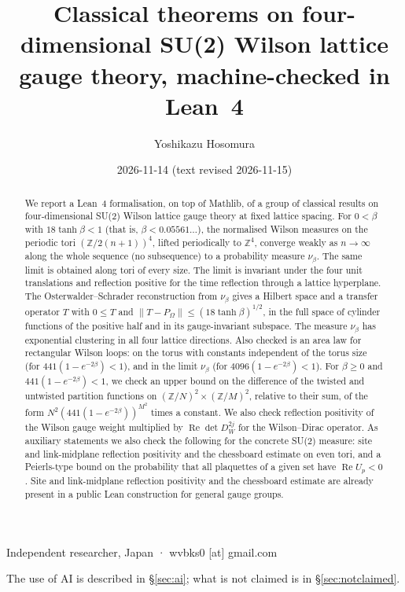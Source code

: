 \documentclass[11pt,a4paper]{article}
\title{Classical theorems on four-dimensional SU(2) Wilson lattice gauge theory, machine-checked in Lean~4}
\author{Yoshikazu Hosomura}
\date{2026-11-14 (text revised 2026-11-15)}
\theoremstyle{definition}
\theoremstyle{remark}
\newcommand{\Z}{\mathbb{Z}}
\renewcommand{\Re}{\operatorname{Re}}
\begin{document}
\sloppy
\maketitle
\begin{center}\small Independent researcher, Japan · wvbks0 [at] gmail.com\end{center}
\begin{center}\small The use of AI is described in \S\ref{sec:ai}; what is not claimed is in \S\ref{sec:notclaimed}.\end{center}

\begin{abstract}
We report a Lean~4 formalisation, on top of Mathlib, of a group of classical results on four-dimensional SU(2) Wilson lattice gauge theory at fixed lattice spacing.
For $0<\beta$ with $18\tanh\beta<1$ (that is, $\beta<0.05561\ldots$), the normalised Wilson measures on the periodic tori $(\Z/2(n+1))^4$, lifted periodically to $\Z^4$, converge weakly as $n\to\infty$ along the whole sequence (no subsequence) to a probability measure $\nu_\beta$.
The same limit is obtained along tori of every size.
The limit is invariant under the four unit translations and reflection positive for the time reflection through a lattice hyperplane.
The Osterwalder--Schrader reconstruction from $\nu_\beta$ gives a Hilbert space and a transfer operator $T$ with $0\le T$ and $\|T-P_\Omega\|\le(18\tanh\beta)^{1/2}$, in the full space of cylinder functions of the positive half and in its gauge-invariant subspace.
The measure $\nu_\beta$ has exponential clustering in all four lattice directions.
Also checked is an area law for rectangular Wilson loops: on the torus with constants independent of the torus size (for $441(1-e^{-2\beta})<1$), and in the limit $\nu_\beta$ (for $4096(1-e^{-2\beta})<1$).
For $\beta\ge0$ and $441(1-e^{-2\beta})<1$, we check an upper bound on the difference of the twisted and untwisted partition functions on $(\Z/N)^2\times(\Z/M)^2$, relative to their sum, of the form $N^2(441(1-e^{-2\beta}))^{M^2}$ times a constant.
We also check reflection positivity of the Wilson gauge weight multiplied by $\Re\det D_W^{2j}$ for the Wilson--Dirac operator.
As auxiliary statements we also check the following for the concrete SU(2) measure: site and link-midplane reflection positivity and the chessboard estimate on even tori, and a Peierls-type bound on the probability that all plaquettes of a given set have $\Re U_p<0$.
Site and link-midplane reflection positivity and the chessboard estimate are already present in a public Lean construction for general gauge groups.

\end{abstract}
\end{document}
